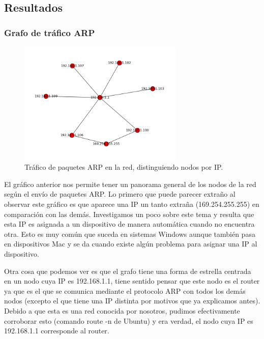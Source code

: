 \documentclass{article}
\theoremstyle{definition}
\theoremstyle{remark}
\begin{document}
\subsection{Resultados}
\subsubsection{Grafo de tráfico ARP}
\begin{figure}[H]
    \centering
    \includegraphics[width=0.70\textwidth]{../captures/CasaGerman/conn_ip.png}
    \caption{Tráfico de paquetes ARP en la red, distinguiendo nodos por IP.}
    \label{fig:mesh1}
\end{figure}
El gráfico anterior nos permite tener un panorama general de los nodos de la red según el envío de paquetes ARP. Lo primero que puede parecer extraño al observar este gráfico es que aparece una IP un tanto extraña (169.254.255.255) en comparación con las demás. Investigamos un poco sobre este tema y resulta que esta IP es asignada a un dispositivo de manera automática cuando no encuentra otra. Esto es muy común que suceda en sistemas Windows aunque también pasa en dispositivos Mac y se da cuando existe algún problema para asignar una IP al dispositivo.
\par Otra cosa que podemos ver es que el grafo tiene una forma de estrella centrada en un nodo cuya IP es 192.168.1.1, tiene sentido pensar que este nodo es el router ya que es el que se comunica mediante el protocolo ARP con todos los demás nodos (excepto el que tiene una IP distinta por motivos que ya explicamos antes). Debido a que esta es una red conocida por nosotros, pudimos efectivamente corroborar esto (comando route -n de Ubuntu) y era verdad, el nodo cuya IP es 192.168.1.1 corresponde al router.
\end{document}
